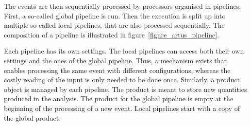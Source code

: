 \documentclass[3p]{elsarticle}
\begin{document}
The events are then sequentially processed by processors organised in pipelines.
First, a so-called global pipeline is run.
Then the execution is split up into multiple so-called local pipelines, that are also processed sequentially.
The composition of a pipeline is illustrated in figure~\ref{figure_artus_pipeline}.

Each pipeline has its own settings.
The local pipelines can access both their own settings and the ones of the global pipeline.
Thus, a mechanism exists that enables processing the same event with different configurations, whereas the costly reading of the input is only needed to be done once.
Similarly, a product object is managed by each pipeline.
The product is meant to store new quantities produced in the analysis.
The product for the global pipeline is empty at the beginning of the processing of a new event.
Local pipelines start with a copy of the global product.
\end{document}
